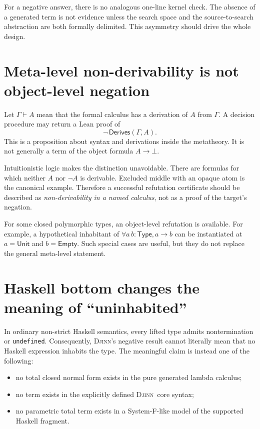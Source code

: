 \documentclass[11pt,letterpaper,openany]{report}
\theoremstyle{definition}
\theoremstyle{remark}
\newcommand{\Djinn}{\textsc{Djinn}}
\newcommand{\code}[1]{\texttt{#1}}
\begin{document}
For a negative answer, there is no analogous one-line kernel check. The absence of a generated term is not evidence unless the search space and the source-to-search abstraction are both formally delimited. This asymmetry should drive the whole design.

\section{Meta-level non-derivability is not object-level negation}
\label{sec:meta-vs-object}

Let \(\Gamma \vdash A\) mean that the formal calculus has a derivation of \(A\) from \(\Gamma\). A decision procedure may return a Lean proof of
\[
  \neg\,\mathsf{Derives}(\Gamma,A).
\]
This is a proposition about syntax and derivations inside the metatheory. It is not generally a term of the object formula \(A \to \bot\).

Intuitionistic logic makes the distinction unavoidable. There are formulas for which neither \(A\) nor \(\neg A\) is derivable. Excluded middle with an opaque atom is the canonical example. Therefore a successful refutation certificate should be described as \emph{non-derivability in a named calculus}, not as a proof of the target's negation.

For some closed polymorphic types, an object-level refutation is available. For example, a hypothetical inhabitant of \(\forall a\,b:\mathsf{Type}, a\to b\) can be instantiated at \(a=\mathsf{Unit}\) and \(b=\mathsf{Empty}\). Such special cases are useful, but they do not replace the general meta-level statement.

\section{Haskell bottom changes the meaning of ``uninhabited''}

In ordinary non-strict Haskell semantics, every lifted type admits nontermination or \code{undefined}. Consequently, \Djinn's negative result cannot literally mean that no Haskell expression inhabits the type. The meaningful claim is instead one of the following:

\begin{itemize}
\item no total closed normal form exists in the pure generated lambda calculus;
\item no term exists in the explicitly defined \Djinn\ core syntax;
\item no parametric total term exists in a System-F-like model of the supported Haskell fragment.
\end{itemize}
\end{document}
